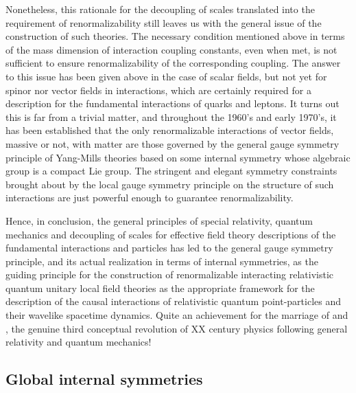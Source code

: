 \documentclass[a4paper,11pt]{article}
\begin{document}
Nonetheless, this rationale for the decoupling of scales translated into
the requirement of renormalizability still leaves us with the general
issue of the construction of such theories. The necessary condition
mentioned above in terms of the mass dimension of interaction coupling
constants, even when met, is not sufficient to ensure renormalizability
of the corresponding coupling. The answer to this issue has been given above
in the case of scalar fields, but not yet for spinor nor vector fields
in interactions, which are certainly required for a description for the
fundamental interactions of quarks and leptons. It turns out this is far
from a trivial matter, and throughout the 1960's and early 1970's, it has 
been established\cite{HV} that the only renormalizable interactions of 
vector fields, 
massive or not, with matter are those governed by the ge\-ne\-ral gauge 
symmetry principle of Yang-Mills theories based on some internal symmetry 
whose algebraic group is a compact Lie group. The stringent and elegant 
symmetry constraints brought about by the local gauge symmetry principle on 
the structure of such interactions are just powerful enough to guarantee 
renormalizability.

Hence, in conclusion, the general principles of special relativity,
quantum mechanics and decoupling of scales for effective field theory
descriptions of the fundamental interactions and particles has led
to the general gauge symmetry principle, and its actual realization
in terms of internal symmetries, as the guiding principle for the
construction of renormalizable interacting relativistic quantum
unitary local field theories as the appropriate framework for the description
of the causal interactions of relativistic quantum point-particles and their
wavelike spacetime dynamics. Quite an achievement for the marriage of
\myHighlight{$\hbar$}\coordHE{} and \coordHE{}, the genuine third conceptual revolution of XX\coordHE{} 
century physics following general relativity and quantum mechanics!

\subsection{Global internal symmetries}
\label{Subsect4.2}
\end{document}
